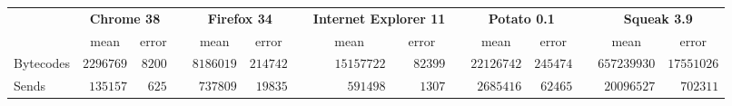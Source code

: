 {\footnotesize
\begin{tabular}{lrrcrrcrrcrrcrr}
\toprule
\multicolumn{1}{l}{\bfseries  }&\multicolumn{2}{c}{\bfseries Chrome 38}&\multicolumn{1}{c}{\bfseries }&\multicolumn{2}{c}{\bfseries Firefox 34}&\multicolumn{1}{c}{\bfseries }&\multicolumn{2}{c}{\bfseries Internet Explorer 11}&\multicolumn{1}{c}{\bfseries }&\multicolumn{2}{c}{\bfseries Potato 0.1}&\multicolumn{1}{c}{\bfseries }&\multicolumn{2}{c}{\bfseries Squeak 3.9}\tabularnewline
\cline{2-3} \cline{5-6} \cline{8-9} \cline{11-12} \cline{14-15}
\multicolumn{1}{l}{}&\multicolumn{1}{c}{mean}&\multicolumn{1}{c}{error}&\multicolumn{1}{c}{}&\multicolumn{1}{c}{mean}&\multicolumn{1}{c}{error}&\multicolumn{1}{c}{}&\multicolumn{1}{c}{mean}&\multicolumn{1}{c}{error}&\multicolumn{1}{c}{}&\multicolumn{1}{c}{mean}&\multicolumn{1}{c}{error}&\multicolumn{1}{c}{}&\multicolumn{1}{c}{mean}&\multicolumn{1}{c}{error}\tabularnewline
\midrule
Bytecodes&$2296769$&$8200$&&$8186019$&$214742$&&$15157722$&$82399$&&$22126742$&$245474$&&$657239930$&$17551026$\tabularnewline
Sends&$ 135157$&$ 625$&&$ 737809$&$ 19835$&&$  591498$&$ 1307$&&$ 2685416$&$ 62465$&&$ 20096527$&$  702311$\tabularnewline
\bottomrule
\end{tabular}}
